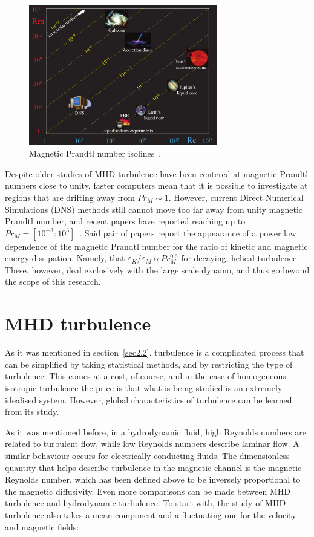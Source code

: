 \documentclass[12pt,a4paper]{report}
\begin{document}
\begin{figure}[!ht]
\centering
\includegraphics[width=0.73\textwidth]{img/PrM_spectrum}
\caption{Magnetic Prandtl number isolines~\cite{plunian2013shell}.}
\label{fig3.1}
\end{figure}

Despite older studies of MHD turbulence have been centered at magnetic Prandtl numbers close to unity, faster computers mean that it is possible to investigate at regions that are drifting away from $Pr_M\sim1$. However, current Direct Numerical Simulations (DNS) methods still cannot move too far away from unity magnetic Prandtl number, and recent papers have reported reaching up to $Pr_M=[10^{-3}:10^3]$~\cite{brandenburg2011dissipation, sahoo2011systematics}. Said pair of papers report the appearance of a power law dependence of the magnetic Prandtl number for the ratio of kinetic and magnetic energy dissipation. Namely, that $\varepsilon_K/\varepsilon_M~\alpha~Pr_M^{0.6}$ for decaying, helical turbulence. These, however, deal exclusively with the large scale dynamo, and thus go beyond the scope of this research.

\section{MHD turbulence}
\label{sec3.2}

As it was mentioned in section~\ref{sec2.2}, turbulence is a complicated process that can be simplified by taking statistical methods, and by restricting the type of turbulence. This comes at a cost, of course, and in the case of homogeneous isotropic turbulence the price is that what is being studied is an extremely idealised system. However, global characteristics of turbulence can be learned from its study.

As it was mentioned before, in a hydrodynamic fluid, high Reynolds numbers are related to turbulent flow, while low Reynolds numbers describe laminar flow. A similar behaviour occurs for electrically conducting fluids. The dimensionless quantity that helps describe turbulence in the magnetic channel is the magnetic Reynolds number, which has been defined above to be inversely proportional to the magnetic diffusivity. Even more comparisons can be made between MHD turbulence and hydrodynamic turbulence. To start with, the study of MHD turbulence also takes a mean component and a fluctuating one for the velocity and magnetic fields:
\end{document}
